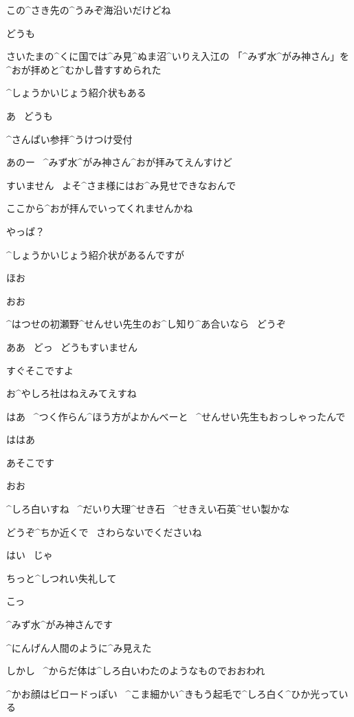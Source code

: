 \Person この^{さき}{先}の^{うみぞ}{海沿}いだけどね

\Ayase どうも

\Ayase さいたまの^{くに}{国}では^{み}{見}^{ぬま}{沼}^{いりえ}{入江}の
 「^{みず}{水}^{がみ}{神}さん」を^{おが}{拝}めと^{むかし}{昔}すすめられた

\Ayase ^{しょうかいじょう}{紹介状}もある

\page[88]
\Ayase あ
\ どうも

\Sign ^{さんぱい}{参拝}^{うけつけ}{受付}

\Ayase あのー
\ ^{みず}{水}^{がみ}{神}さん^{おが}{拝}みてえんすけど

\page[89]
\Person すいません
\ よそ^{さま}{様}にはお^{み}{見}せできなおんで

\Person ここから^{おが}{拝}んでいってくれませんかね

\Ayase やっぱ？

\Ayase ^{しょうかいじょう}{紹介状}があるんですが

\Person ほお

\Person おお

\Person ^{はつせの}{初瀬野}^{せんせい}{先生}のお^{し}{知}り^{あ}{合}いなら
\ どうぞ

\Ayase ああ
\ どっ
\ どうもすいません

\page[90]
\Person すぐそこですよ

\Ayase お^{やしろ}{社}はねえみてえすね

\Person はあ
\ ^{つく}{作}らん^{ほう}{方}がよかんべーと
\ ^{せんせい}{先生}もおっしゃったんで

\Ayase ははあ

\page[91]
\Person あそこです

\Ayase おお

\Ayase ^{しろ}{白}いすね
\ ^{だいり}{大理}^{せき}{石}
\ ^{せきえい}{石英}^{せい}{製}かな

\Person どうぞ^{ちか}{近}くで
\ さわらないでくださいね

\Ayase はい
\ じゃ

\Ayase ちっと^{しつれい}{失礼}して

\page[93]
\Ayase こっ

\Person ^{みず}{水}^{がみ}{神}さんです

\page[94]
\Ayase ^{にんげん}{人間}のように^{み}{見}えた

\Ayase しかし
\ ^{からだ}{体}は^{しろ}{白}いわたのようなものでおおわれ

\Ayase ^{かお}{顔}はビロードっぽい
\ ^{こま}{細}かい^{きもう}{起毛}で^{しろ}{白}く^{ひか}{光}っている

